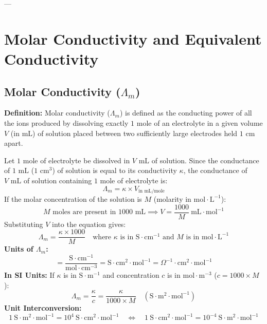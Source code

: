 ---

\section{Molar Conductivity and Equivalent Conductivity}

\subsection{Molar Conductivity ($\Lambda_m$)}
\textbf{Definition:} Molar conductivity ($\Lambda_m$) is defined as the conducting power of all the ions produced by dissolving exactly $1\text{ mole}$ of an electrolyte in a given volume $V$ (in $\text{mL}$) of solution placed between two sufficiently large electrodes held $1\text{ cm}$ apart.

Let $1\text{ mole}$ of electrolyte be dissolved in $V\text{ mL}$ of solution. Since the conductance of $1\text{ mL}$ ($1\text{ cm}^3$) of solution is equal to its conductivity $\kappa$, the conductance of $V\text{ mL}$ of solution containing $1\text{ mole}$ of electrolyte is:
\begin{equation}
    \Lambda_m = \kappa \times V_{\text{in mL/mole}}
\end{equation}
If the molar concentration of the solution is $M$ (molarity in $\text{mol}\cdot\text{L}^{-1}$):
\begin{equation}
    M\text{ moles are present in } 1000\text{ mL} \implies V = \frac{1000}{M}\ \text{mL}\cdot\text{mol}^{-1}
\end{equation}
Substituting $V$ into the equation gives:
\begin{equation}
    \boxed{\Lambda_m = \frac{\kappa \times 1000}{M}} \quad \text{where } \kappa \text{ is in } \text{S}\cdot\text{cm}^{-1} \text{ and } M \text{ is in } \text{mol}\cdot\text{L}^{-1}
\end{equation}
\textbf{Units of $\Lambda_m$:}
\begin{equation}
    [\Lambda_m] = \frac{\text{S}\cdot\text{cm}^{-1}}{\text{mol}\cdot\text{cm}^{-3}} = \text{S}\cdot\text{cm}^2\cdot\text{mol}^{-1} = \Omega^{-1}\cdot\text{cm}^2\cdot\text{mol}^{-1}
\end{equation}
\textbf{In SI Units:} If $\kappa$ is in $\text{S}\cdot\text{m}^{-1}$ and concentration $c$ is in $\text{mol}\cdot\text{m}^{-3}$ ($c = 1000 \times M$):
\begin{equation}
    \boxed{\Lambda_m = \frac{\kappa}{c} = \frac{\kappa}{1000 \times M}} \quad \left(\text{S}\cdot\text{m}^2\cdot\text{mol}^{-1}\right)
\end{equation}
\textbf{Unit Interconversion:}
\begin{equation}
    1\ \text{S}\cdot\text{m}^2\cdot\text{mol}^{-1} = 10^4\ \text{S}\cdot\text{cm}^2\cdot\text{mol}^{-1} \quad \iff \quad 1\ \text{S}\cdot\text{cm}^2\cdot\text{mol}^{-1} = 10^{-4}\ \text{S}\cdot\text{m}^2\cdot\text{mol}^{-1}
\end{equation}

